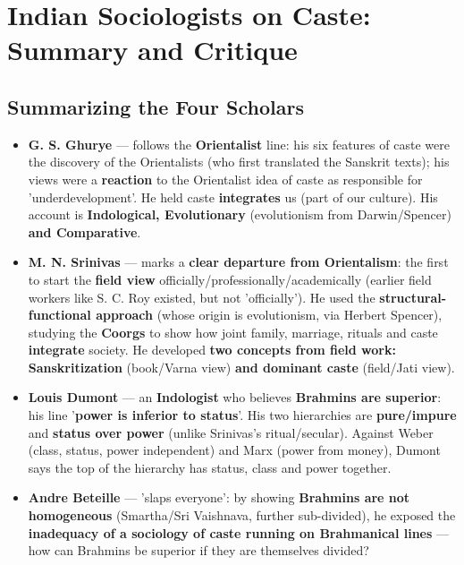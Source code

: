 \chapter{Indian Sociologists on Caste: Summary and Critique}

\section{Summarizing the Four Scholars}

\begin{KeyConcept}
\begin{itemize}
\item \textbf{G. S. Ghurye} --- follows the \textbf{Orientalist} line: his six features of caste were the discovery of the Orientalists (who first translated the Sanskrit texts); his views were a \textbf{reaction} to the Orientalist idea of caste as responsible for 'underdevelopment'. He held caste \textbf{integrates} us (part of our culture). His account is \textbf{Indological, Evolutionary} (evolutionism from Darwin/Spencer) \textbf{and Comparative}.
\item \textbf{M. N. Srinivas} --- marks a \textbf{clear departure from Orientalism}: the first to start the \textbf{field view} officially/professionally/academically (earlier field workers like S. C. Roy existed, but not 'officially'). He used the \textbf{structural-functional approach} (whose origin is evolutionism, via Herbert Spencer), studying the \textbf{Coorgs} to show how joint family, marriage, rituals and caste \textbf{integrate} society. He developed \textbf{two concepts from field work: Sanskritization} (book/Varna view) \textbf{and dominant caste} (field/Jati view).
\item \textbf{Louis Dumont} --- an \textbf{Indologist} who believes \textbf{Brahmins are superior}: his line '\textbf{power is inferior to status}'. His two hierarchies are \textbf{pure/impure} and \textbf{status over power} (unlike Srinivas's ritual/secular). Against Weber (class, status, power independent) and Marx (power from money), Dumont says the top of the hierarchy has status, class and power together.
\item \textbf{Andre Beteille} --- 'slaps everyone': by showing \textbf{Brahmins are not homogeneous} (Smartha/Sri Vaishnava, further sub-divided), he exposed the \textbf{inadequacy of a sociology of caste running on Brahmanical lines} --- how can Brahmins be superior if they are themselves divided?
\end{itemize}
\end{KeyConcept}

